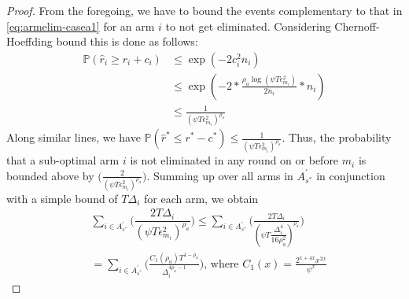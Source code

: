 \begin{proof}
From the foregoing, we have to bound the events complementary to that in \eqref{eq:armelim-casea1} for an arm $i$ to not get eliminated. Considering Chernoff-Hoeffding bound this is done as follows:
  \begin{align*}
\mathbb{P}\left(\hat{r}_{i}\geq r_{i} + c_{i}\right)&\leq \exp(-2c_{i}^{2}n_{i})\\
&\leq \exp(-2 * \frac{\rho_{a}\log (\psi T\epsilon_{m_{i}}^{2})}{2 n_{i}} *n_{i})\\
&\leq \frac{1}{(\psi T\epsilon_{m_{i}}^{2})^{\rho_{a}}}   
  \end{align*}
Along similar lines, we have 
$\mathbb{P}\left(\hat{r}^{*}\leq r^{*} - c^{*}\right)\leq \frac{1}{(\psi  T\epsilon_{m_{i}}^{2})^{\rho_{a}}}.$
Thus, the probability that a sub-optimal arm ${i}$ is not eliminated in any round on or before $m_{i}$ is bounded above by  $\bigg(\frac{2}{(\psi T\epsilon_{m_{i}}^{2})^{\rho_{a}}}\bigg)$. 
 Summing up over all arms in $A_{s^{*}}^{'}$ in conjunction with a simple bound of $T\Delta_{i}$ for each arm, we obtain
   \begin{align*}
&\sum_{i\in A_{s^{*}}^{'}}\bigg(\dfrac{2T\Delta_{i}}{(\psi T\epsilon_{m_{i}}^{2})^{\rho_{a}}}\bigg)
\leq\sum_{i\in A_{s^{*}}^{'}}\bigg(\frac{2T\Delta_{i}}{(\psi T\dfrac{\Delta_{i}^{4}}{16\rho_{a}^{2}})^{\rho_{a}}}\bigg)\\
& =\sum_{i\in A_{s^{*}}^{'}}\bigg(\frac{C_{1}(\rho_{a})T^{1-\rho_{a}}}{\Delta_{i}^{4\rho_{a}-1}}\bigg) \text{, where } C_1(x) = \frac{2^{1+4x}x^{2x}}{\psi^{x}}
   \end{align*}


\end{proof}
